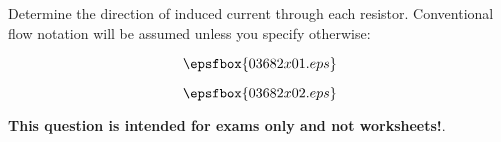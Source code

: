 

Determine the direction of induced current through each resistor.  Conventional flow notation will be assumed unless you specify otherwise:

$$\epsfbox{03682x01.eps}$$







$$\epsfbox{03682x02.eps}$$







{\bf This question is intended for exams only and not worksheets!}.



